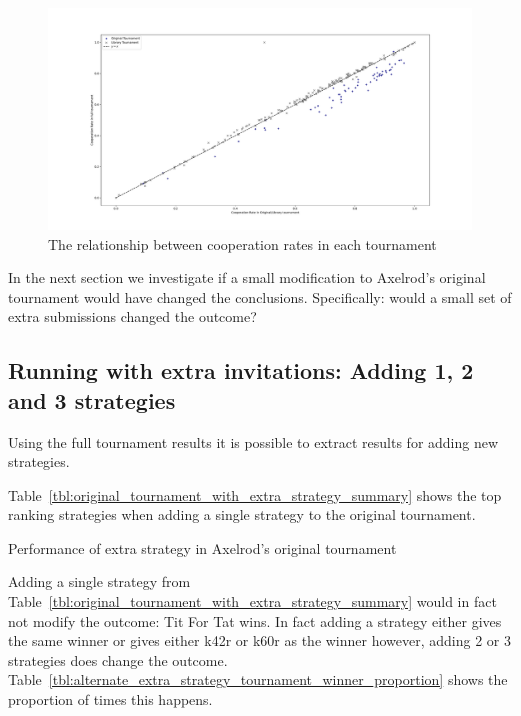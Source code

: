 \documentclass{article}
\begin{document}
\begin{figure}[!hbtp]
    \centering
    \includegraphics[width=.8\textwidth]{assets/relative_cooperation_rates}
    \caption{The relationship between cooperation rates in each tournament}
    \label{fig:relative_cooperation_rates}
\end{figure}

In the next section we investigate if a small modification to Axelrod's original
tournament would have changed the conclusions. Specifically: would a small
set of extra submissions changed the outcome?

\subsection{Running with extra invitations: Adding 1, 2 and 3 strategies}\label{sec:extra_strategy}

Using the full tournament results it is possible to extract results for adding
new strategies.

Table~\ref{tbl:original_tournament_with_extra_strategy_summary} shows the top
ranking strategies when adding a single strategy to the original tournament.

\begin{table}[!hbtp]
        \centering
        
        \caption{Performance of extra strategy in Axelrod's original tournament}
        \label{tbl:original_tournament_with_extra_strategy_summary}
\end{table}

Adding a single strategy from Table~\ref{tbl:original_tournament_with_extra_strategy_summary} 
would in fact not modify the outcome: Tit For Tat wins. In fact adding a
strategy either gives the same winner or gives either k42r or k60r as the
winner however, adding 2 or 3 strategies does change the outcome. 
Table~\ref{tbl:alternate_extra_strategy_tournament_winner_proportion} 
shows the proportion of times this happens.
\end{document}
